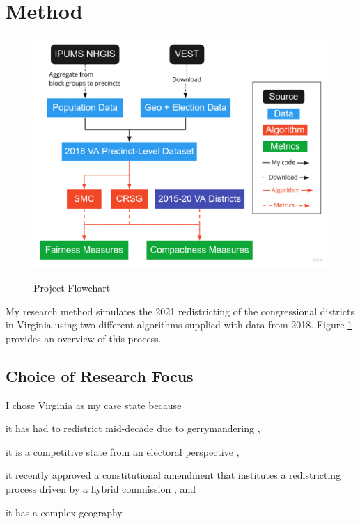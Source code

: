 \section{Method}
\label{sec:method}

\begin{figure}[H]
    \caption{Project Flowchart}
    \includegraphics[width=0.85\linewidth]{img/flowchart.pdf}
    \label{fig:flowchart}
    \raggedright
\end{figure}  

My research method simulates the 2021 redistricting of the congressional districts in Virginia using two different algorithms supplied with data from 2018. Figure \ref{fig:flowchart} provides an overview of this process.

\subsection{Choice of Research Focus}

I chose Virginia as my case state because 
\begin{seriate}
    \item it has had to redistrict mid-decade due to gerrymandering \parencite[see][]{wittmanvpersonhuballah2016},
    \item it is a competitive state from an electoral perspective \parencite{virginiadeparmentofelections2021}, 
    \item it recently approved a constitutional amendment that institutes a redistricting process driven by a hybrid commission \parencite{ballotpedia2020}, and
    \item it has a complex geography.
\end{seriate}

